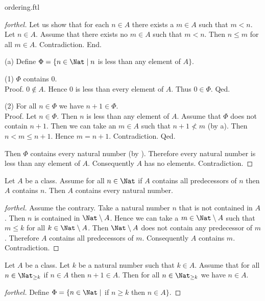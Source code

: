 \documentclass{naproche-library}
\begin{document}
\begin{smodule}{ordering.ftl}
\begin{proof}[forthel]
    Let us show that for each $n \in A$ there exists a $m \in A$ such that $m < n$.
      Let $n \in A$.
      Assume that there exists no $m \in A$ such that $m < n$.
      Then $n \leq m$ for all $m \in A$.
      Contradiction.
    End.

    (a) Define $\Phi = \{ n \in \Nat \mid n$ is less than any element of $A \}$.

    (1) $\Phi$ contains $0$. \\
    Proof.
      $0 \notin A$.
      Hence $0$ is less than every element of $A$.
      Thus $0 \in \Phi$.
    Qed.

    (2) For all $n \in \Phi$ we have $n + 1 \in \Phi$. \\
    Proof.
      Let $n \in \Phi$.
      Then $n$ is less than any element of $A$.
      Assume that $\Phi$ does not contain $n + 1$.
      Then we can take an $m \in A$ such that $n + 1 \nless m$ (by a).
      Then $n < m \leq n + 1$.
      Hence $m = n + 1$.
      Contradiction.
    Qed.

    Then $\Phi$ contains every natural number (by ).
    Therefore every natural number is less than any element of $A$.
    Consequently $A$ has no elements.
    Contradiction.
  \end{proof}

  \begin{theorem}[forthel,id=ARITHMETIC_04_3609801697263616,printid]
    Let $A$ be a class.
    Assume for all $n \in \Nat$ if $A$ contains all predecessors of $n$ then $A$ contains $n$.
    Then $A$ contains every natural number.
  \end{theorem}
  \begin{proof}[forthel]
    Assume the contrary.
    Take a natural number $n$ that is not contained in $A$.
    Then $n$ is contained in $\Nat \setminus A$.
    Hence we can take a $m \in \Nat \setminus A$ such that $m \leq k$ for all $k \in \Nat \setminus A$.
    Then $\Nat \setminus A$ does not contain any predecessor of $m$.
    Therefore $A$ contains all predecessors of $m$.
    Consequently $A$ contains $m$.
    Contradiction.
  \end{proof}

  \begin{theorem}[forthel,id=ARITHMETIC_04_4976599269113856,printid]
    Let $A$ be a class.
    Let $k$ be a natural number such that $k \in A$.
    Assume that for all $n \in \Nat_{\geq k}$ if $n \in A$ then $n + 1 \in A$.
    Then for all $n \in \Nat_{\geq k}$ we have $n \in A$.
  \end{theorem}
  \begin{proof}[forthel]
    Define $\Phi = \{n \in \Nat \mid$ if $n \geq k$ then $n \in A \}$.


\end{proof}
\end{smodule}
\end{document}
